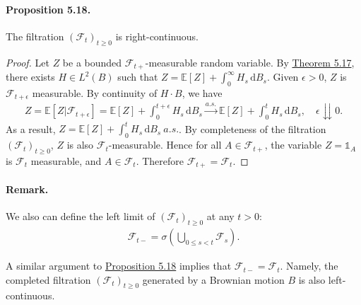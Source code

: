 \documentclass{article}
\numberwithin{equation}{section}
\newcommand{\E}{\mathbb{E}}
\renewcommand{\d}{\mathrm{d}}
\theoremstyle{plain}
\theoremstyle{definition}
\begin{document}
\paragraph{Proposition 5.18.\label{prop:5.18}} The filtration $(\mathscr{F}_t)_{t\geq 0}$ is right-continuous.
\begin{proof}
Let $Z$ be a bounded $\mathscr{F}_{t+}$-measurable random variable. By \hyperref[thm:5.17]{Theorem 5.17}, there exists $H\in L^2(B)$ such that $Z=\E[Z]+\int_0^\infty H_s\,\d B_s$. Given $\epsilon>0$, $Z$ is $\mathscr{F}_{t+\epsilon}$ measurable. By continuity of $H\cdot B$, we have
\begin{align*}
	Z=\E[Z|\mathscr{F}_{t+\epsilon}]=\E[Z]+\int_0^{t+\epsilon}H_s\,\d B_s\overset{a.s.}{\rightarrow}\E[Z]+\int_0^{t}H_s\,\d B_s,\quad\epsilon\downdownarrows 0.
\end{align*}
As a result, $Z=\E[Z]+\int_0^t H_s\,\d B_s\ a.s.$. By completeness of the filtration $(\mathscr{F}_t)_{t\geq 0}$, $Z$ is also $\mathscr{F}_t$-measurable. Hence for all $A\in\mathscr{F}_{t+}$, the variable $Z=\mathds{1}_A$ is $\mathscr{F}_t$ measurable, and $A\in\mathscr{F}_t$. Therefore $\mathscr{F}_{t+}=\mathscr{F}_t$.
\end{proof}

\paragraph{Remark.} We also can define the left limit of $(\mathscr{F}_t)_{t\geq 0}$ at any $t>0$:
\begin{align*}
	\mathscr{F}_{t-}=\sigma\left(\bigcup_{0\leq s<t}\mathscr{F}_s\right).
\end{align*}

A similar argument to \hyperref[prop:5.18]{Proposition 5.18} implies that $\mathscr{F}_{t-}=\mathscr{F}_t$. Namely, the completed filtration $(\mathscr{F}_t)_{t\geq 0}$ generated by a Brownian motion $B$ is also left-continuous.
\end{document}
